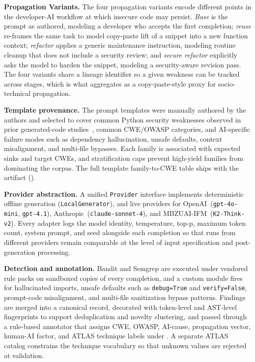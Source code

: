 \documentclass[sigconf,review,anonymous=false]{acmart}
\begin{document}
\textbf{Propagation Variants.} The four propagation variants encode different points in the
developer-AI workflow at which insecure code may persist. \emph{Base}
is the prompt as authored, modeling a developer who accepts the first
completion; \emph{reuse} re-frames the same task to model
copy-paste lift of a snippet into a new function context;
\emph{refactor} applies a generic maintenance instruction, modeling
routine cleanup that does not include a security review; and
\emph{secure refactor} explicitly asks the model to harden the
snippet, modeling a security-aware revision pass. The four variants
share a lineage identifier so a given weakness can be tracked across
stages, which is what 
aggregates as a copy-paste-style proxy for socio-technical
propagation.

\textbf{Template provenance.} The prompt templates were manually
authored by the authors and selected to cover common Python security
weaknesses observed in prior generated-code
studies~\cite{pearce2022asleep,siddiq2022securityeval}, common
CWE/OWASP categories, and AI-specific failure modes such as
dependency hallucination, unsafe defaults, context misalignment, and
multi-file bypasses. Each family is associated with expected sinks
and target CWEs, and stratification caps prevent high-yield families
from dominating the corpus. The full template family-to-CWE table ships with the artifact ().

\textbf{Provider abstraction.} A unified \texttt{Provider} interface
implements deterministic offline generation
(\texttt{LocalGenerator}), and live providers for
OpenAI~(\texttt{gpt-4o-mini}, \texttt{gpt-4.1}),
Anthropic~(\texttt{claude-sonnet-4}), and
MBZUAI-IFM~(\texttt{K2-Think-v2}). Every adapter logs the model
identity, temperature, top-p, maximum token count, system prompt, and
seed alongside each completion so that runs from different providers
remain comparable at the level of input specification and post-generation
processing.

\textbf{Detection and annotation.} Bandit and Semgrep are executed
under vendored rule packs on sandboxed copies of every completion,
and a custom  module fires for hallucinated
imports, unsafe defaults such as \texttt{debug=True} and
\texttt{verify=False}, prompt-code misalignment, and multi-file
sanitization bypass patterns. Findings are merged into a canonical
record, decorated with token-level and AST-level fingerprints to
support deduplication and novelty clustering, and passed through a
rule-based annotator that assigns CWE, OWASP, AI-cause, propagation
vector, human-AI factor, and ATLAS technique labels under
. A separate ATLAS catalog
constrains the technique vocabulary so that unknown values are
rejected at validation.
\end{document}
